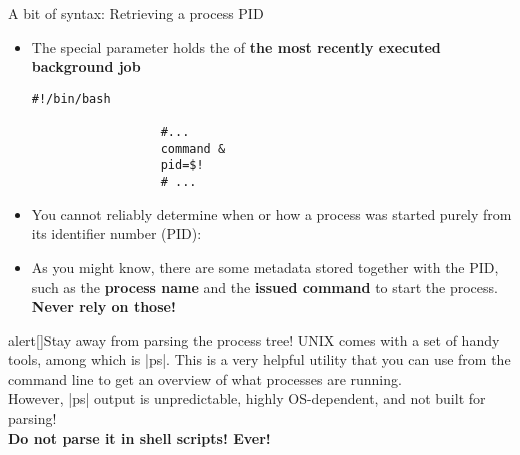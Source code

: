 \begin{frame}[fragile]{A bit of syntax: Retrieving a process PID}
    \vspace{-3mm}
    \begin{itemize}
        \item The \PB{\texttt{\$!}} special parameter holds the  of \textbf{the most recently executed background job}
              \begin{lstlisting}[style=MyBash, numbers=none, aboveskip=2mm, belowskip=-5mm, xrightmargin=25mm]
                  #!/bin/bash

                  #...
                  command &
                  pid=$!
                  # ...
              \end{lstlisting}
        \item You cannot reliably determine when or how a process was started purely from its identifier number (PID): 
        \item As you might know, there are some metadata stored together with the PID, such as the \textbf{process name} and the \textbf{issued command} to start the process. \alert{\textbf{Never rely on those!}}
    \end{itemize}
    \vspace{-1mm}
    \begin{varblock}{alert}[\textwidth]{Stay away from parsing the process tree!}
        UNIX comes with a set of handy tools, among which is \bash|ps|.
        This is a very helpful utility that you can use from the command line to get an overview of what processes are running.\\
        \alert{However, \bash|ps| output is unpredictable, highly OS-dependent, and not built for parsing!\\\textbf{Do not parse it in shell scripts! Ever!}}
    \end{varblock}
\end{frame}
